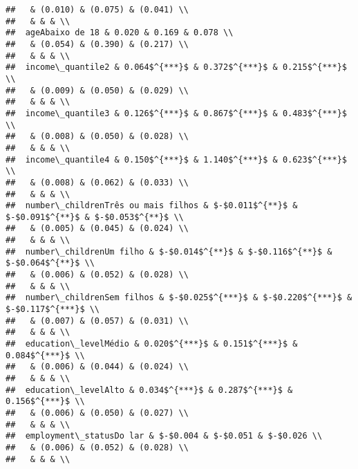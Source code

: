 \documentclass[
]{article}
\begin{document}
\begin{verbatim}
##   & (0.010) & (0.075) & (0.041) \\ 
##   & & & \\ 
##  ageAbaixo de 18 & 0.020 & 0.169 & 0.078 \\ 
##   & (0.054) & (0.390) & (0.217) \\ 
##   & & & \\ 
##  income\_quantile2 & 0.064$^{***}$ & 0.372$^{***}$ & 0.215$^{***}$ \\ 
##   & (0.009) & (0.050) & (0.029) \\ 
##   & & & \\ 
##  income\_quantile3 & 0.126$^{***}$ & 0.867$^{***}$ & 0.483$^{***}$ \\ 
##   & (0.008) & (0.050) & (0.028) \\ 
##   & & & \\ 
##  income\_quantile4 & 0.150$^{***}$ & 1.140$^{***}$ & 0.623$^{***}$ \\ 
##   & (0.008) & (0.062) & (0.033) \\ 
##   & & & \\ 
##  number\_childrenTrês ou mais filhos & $-$0.011$^{**}$ & $-$0.091$^{**}$ & $-$0.053$^{**}$ \\ 
##   & (0.005) & (0.045) & (0.024) \\ 
##   & & & \\ 
##  number\_childrenUm filho & $-$0.014$^{**}$ & $-$0.116$^{**}$ & $-$0.064$^{**}$ \\ 
##   & (0.006) & (0.052) & (0.028) \\ 
##   & & & \\ 
##  number\_childrenSem filhos & $-$0.025$^{***}$ & $-$0.220$^{***}$ & $-$0.117$^{***}$ \\ 
##   & (0.007) & (0.057) & (0.031) \\ 
##   & & & \\ 
##  education\_levelMédio & 0.020$^{***}$ & 0.151$^{***}$ & 0.084$^{***}$ \\ 
##   & (0.006) & (0.044) & (0.024) \\ 
##   & & & \\ 
##  education\_levelAlto & 0.034$^{***}$ & 0.287$^{***}$ & 0.156$^{***}$ \\ 
##   & (0.006) & (0.050) & (0.027) \\ 
##   & & & \\ 
##  employment\_statusDo lar & $-$0.004 & $-$0.051 & $-$0.026 \\ 
##   & (0.006) & (0.052) & (0.028) \\ 
##   & & & \\ 

\end{verbatim}
\end{document}
